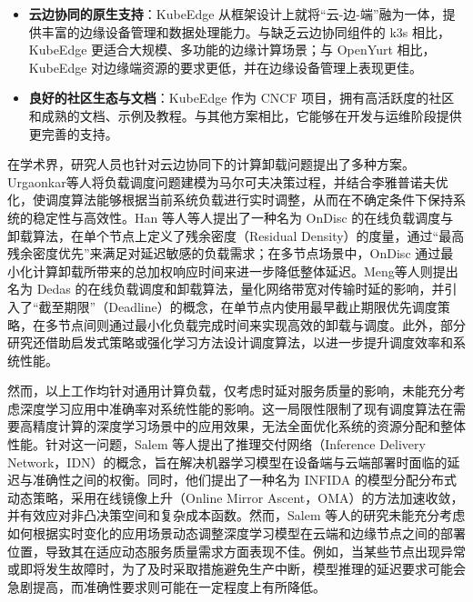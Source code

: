 \begin{itemize} 
\item \textbf{云边协同的原生支持}：KubeEdge 从框架设计上就将“云-边-端”融为一体，提供丰富的边缘设备管理和数据处理能力。与缺乏云边协同组件的 k3s 相比，KubeEdge 更适合大规模、多功能的边缘计算场景；与 OpenYurt 相比，KubeEdge 对边缘端资源的要求更低，并在边缘设备管理上表现更佳。
\item \textbf{良好的社区生态与文档}：KubeEdge 作为 CNCF 项目，拥有高活跃度的社区和成熟的文档、示例及教程。与其他方案相比，它能够在开发与运维阶段提供更完善的支持。 
\end{itemize}

在学术界，研究人员也针对云边协同下的计算卸载问题提出了多种方案。Urgaonkar等人\cite{urgaonkar2015dynamic}将负载调度问题建模为马尔可夫决策过程，并结合李雅普诺夫优化，使调度算法能够根据当前系统负载进行实时调整，从而在不确定条件下保持系统的稳定性与高效性。Han 等人\cite{han2019ondisc}等人提出了一种名为 OnDisc 的在线负载调度与卸载算法，在单个节点上定义了残余密度（Residual Density）的度量，通过“最高残余密度优先”来满足对延迟敏感的负载需求；在多节点场景中，OnDisc 通过最小化计算卸载所带来的总加权响应时间来进一步降低整体延迟。Meng等人\cite{meng2019online}则提出名为 Dedas 的在线负载调度和卸载算法，量化网络带宽对传输时延的影响，并引入了“截至期限”（Deadline）的概念，在单节点内使用最早截止期限优先调度策略，在多节点间则通过最小化负载完成时间来实现高效的卸载与调度。此外，部分研究\cite{崔玉亚2021一种面向移动边缘计算的多用户细粒度任务卸载调度方法,邝祝芳2022基于深度强化学习的多用户边缘计算任务卸载调度与资源分配算法,郑守建2022一种基于综合匹配度的边缘计算系统任务调度方法,张斐斐2023边缘计算中协作计算卸载与动态任务调度}还借助启发式策略或强化学习方法设计调度算法，以进一步提升调度效率和系统性能。

然而，以上工作均针对通用计算负载，仅考虑时延对服务质量的影响，未能充分考虑深度学习应用中准确率对系统性能的影响。这一局限性限制了现有调度算法在需要高精度计算的深度学习场景中的应用效果，无法全面优化系统的资源分配和整体性能。针对这一问题，Salem 等人\cite{salem2023toward}提出了推理交付网络（Inference Delivery Network，IDN）的概念，旨在解决机器学习模型在设备端与云端部署时面临的延迟与准确性之间的权衡。同时，他们提出了一种名为 INFIDA 的模型分配分布式动态策略，采用在线镜像上升（Online Mirror Ascent，OMA）的方法加速收敛，并有效应对非凸决策空间和复杂成本函数。然而，Salem 等人的研究未能充分考虑如何根据实时变化的应用场景动态调整深度学习模型在云端和边缘节点之间的部署位置，导致其在适应动态服务质量需求方面表现不佳。例如，当某些节点出现异常或即将发生故障时，为了及时采取措施避免生产中断，模型推理的延迟要求可能会急剧提高，而准确性要求则可能在一定程度上有所降低。

